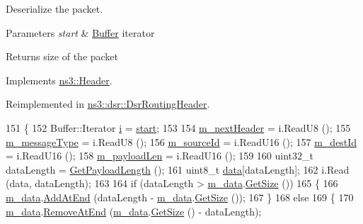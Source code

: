 Deserialize the packet. 


\begin{DoxyParams}{Parameters}
{\em start} & \hyperlink{classns3_1_1Buffer}{Buffer} iterator \\
\hline
\end{DoxyParams}
\begin{DoxyReturn}{Returns}
size of the packet 
\end{DoxyReturn}


Implements \hyperlink{classns3_1_1Header_a78be9400bb66b2a8543606f395ef5396}{ns3\+::\+Header}.



Reimplemented in \hyperlink{classns3_1_1dsr_1_1DsrRoutingHeader_aa3440ffd0d425f8562e313aea165c433}{ns3\+::dsr\+::\+Dsr\+Routing\+Header}.


\begin{DoxyCode}
151 \{
152   Buffer::Iterator \hyperlink{bernuolliDistribution_8m_a6f6ccfcf58b31cb6412107d9d5281426}{i} = \hyperlink{namespacevisualizer_1_1core_a2a35e5d8a34af358b508dac8635754e0}{start};
153 
154   \hyperlink{classns3_1_1dsr_1_1DsrFsHeader_ad8aa1ce25a4d8d8d994351fffd51dac1}{m\_nextHeader} = i.ReadU8 ();
155   \hyperlink{classns3_1_1dsr_1_1DsrFsHeader_a86fd12b9ad8f826549447d2257c2961e}{m\_messageType} = i.ReadU8 ();
156   \hyperlink{classns3_1_1dsr_1_1DsrFsHeader_a6906146cac69c891c9c54a722dc8b36a}{m\_sourceId} = i.ReadU16 ();
157   \hyperlink{classns3_1_1dsr_1_1DsrFsHeader_a4b5e5ccb8af3e9a246e31c9393ed7036}{m\_destId} = i.ReadU16 ();
158   \hyperlink{classns3_1_1dsr_1_1DsrFsHeader_a9dc07aa5b9440cc15d2b99b5f6c57037}{m\_payloadLen} = i.ReadU16 ();
159 
160   uint32\_t dataLength = \hyperlink{classns3_1_1dsr_1_1DsrFsHeader_a30db4a1349e5519f7cd31a9a06e7615c}{GetPayloadLength} ();
161   uint8\_t \hyperlink{topology-example-sim_8cc_a26c65296e316af77b787dc77469bb2a4}{data}[dataLength];
162   i.Read (data, dataLength);
163 
164   \textcolor{keywordflow}{if} (dataLength > \hyperlink{classns3_1_1dsr_1_1DsrFsHeader_af0510de35218eebeefe1122593612475}{m\_data}.\hyperlink{classns3_1_1Buffer_a3047b8f2dad303c6370695122f1884f0}{GetSize} ())
165     \{
166       \hyperlink{classns3_1_1dsr_1_1DsrFsHeader_af0510de35218eebeefe1122593612475}{m\_data}.\hyperlink{classns3_1_1Buffer_a92dd87809af24fb10696fee9a9cb56cf}{AddAtEnd} (dataLength - \hyperlink{classns3_1_1dsr_1_1DsrFsHeader_af0510de35218eebeefe1122593612475}{m\_data}.\hyperlink{classns3_1_1Buffer_a3047b8f2dad303c6370695122f1884f0}{GetSize} ());
167     \}
168   \textcolor{keywordflow}{else}
169     \{
170       \hyperlink{classns3_1_1dsr_1_1DsrFsHeader_af0510de35218eebeefe1122593612475}{m\_data}.\hyperlink{classns3_1_1Buffer_a83b30fd8e1202e778fb471757b800d47}{RemoveAtEnd} (\hyperlink{classns3_1_1dsr_1_1DsrFsHeader_af0510de35218eebeefe1122593612475}{m\_data}.\hyperlink{classns3_1_1Buffer_a3047b8f2dad303c6370695122f1884f0}{GetSize} () - dataLength);

\end{DoxyCode}

